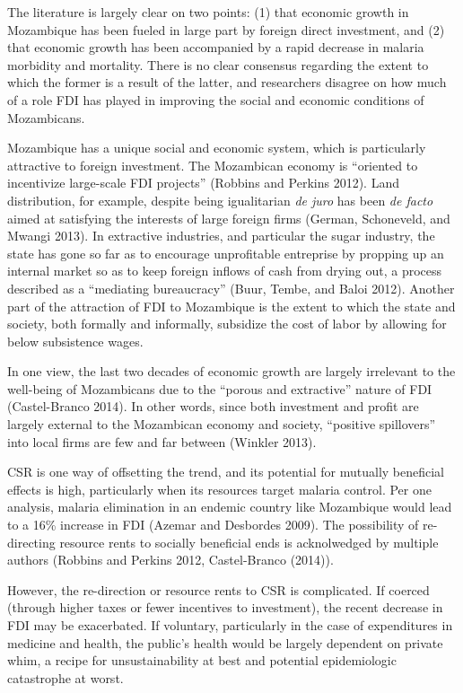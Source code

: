 \documentclass[]{article}
\begin{document}
The literature is largely clear on two points: (1) that economic growth
in Mozambique has been fueled in large part by foreign direct
investment, and (2) that economic growth has been accompanied by a rapid
decrease in malaria morbidity and mortality. There is no clear consensus
regarding the extent to which the former is a result of the latter, and
researchers disagree on how much of a role FDI has played in improving
the social and economic conditions of Mozambicans.

Mozambique has a unique social and economic system, which is
particularly attractive to foreign investment. The Mozambican economy is
``oriented to incentivize large-scale FDI projects'' (Robbins and
Perkins 2012). Land distribution, for example, despite being
igualitarian \emph{de juro} has been \emph{de facto} aimed at satisfying
the interests of large foreign firms (German, Schoneveld, and Mwangi
2013). In extractive industries, and particular the sugar industry, the
state has gone so far as to encourage unprofitable entreprise by
propping up an internal market so as to keep foreign inflows of cash
from drying out, a process described as a ``mediating bureaucracy''
(Buur, Tembe, and Baloi 2012). Another part of the attraction of FDI to
Mozambique is the extent to which the state and society, both formally
and informally, subsidize the cost of labor by allowing for below
subsistence wages.

In one view, the last two decades of economic growth are largely
irrelevant to the well-being of Mozambicans due to the ``porous and
extractive'' nature of FDI (Castel-Branco 2014). In other words, since
both investment and profit are largely external to the Mozambican
economy and society, ``positive spillovers'' into local firms are few
and far between (Winkler 2013).

CSR is one way of offsetting the trend, and its potential for mutually
beneficial effects is high, particularly when its resources target
malaria control. Per one analysis, malaria elimination in an endemic
country like Mozambique would lead to a 16\% increase in FDI (Azemar and
Desbordes 2009). The possibility of re-directing resource rents to
socially beneficial ends is acknolwedged by multiple authors (Robbins
and Perkins 2012, Castel-Branco (2014)).

However, the re-direction or resource rents to CSR is complicated. If
coerced (through higher taxes or fewer incentives to investment), the
recent decrease in FDI may be exacerbated. If voluntary, particularly in
the case of expenditures in medicine and health, the public's health
would be largely dependent on private whim, a recipe for
unsustainability at best and potential epidemiologic catastrophe at
worst.
\end{document}
